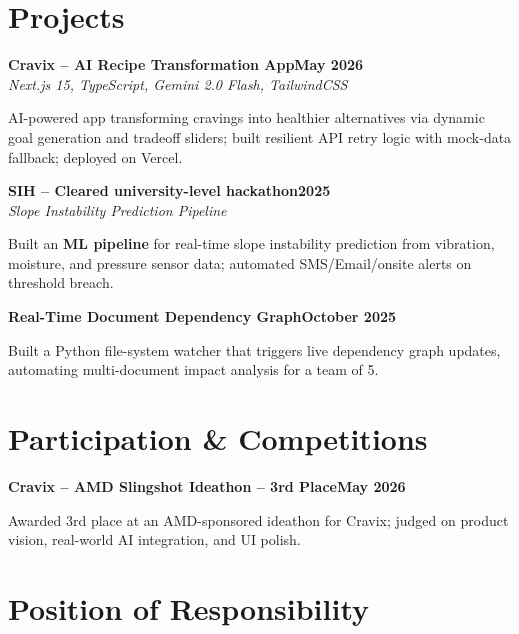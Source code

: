 \documentclass[letterpaper,10pt]{article}
\newcommand{\heading}[2]{
  \hspace{10pt}#1\hfill#2\\
}
\newcommand{\headingBf}[2]{
  \heading{\textbf{#1}}{\textbf{#2}}
}
\newcommand{\headingIt}[2]{
  \heading{\textit{#1}}{\textit{#2}}
}
\newenvironment{resume_list}{
  \vspace{-7pt}
  \begin{itemize}[itemsep=-2px, parsep=1pt, leftmargin=30pt]
}{
  \end{itemize}
}
\begin{document}
  \section{Projects}

  \headingBf{Cravix -- AI Recipe Transformation App}{May 2026}
  \headingIt{Next.js 15, TypeScript, Gemini 2.0 Flash, TailwindCSS}{}
  \begin{resume_list}
    \item AI-powered app transforming cravings into healthier alternatives via dynamic goal generation and tradeoff sliders; built resilient API retry logic with mock-data fallback; deployed on Vercel.
  \end{resume_list}

  \headingBf{SIH -- Cleared university-level hackathon}{2025}
  \headingIt{Slope Instability Prediction Pipeline}{}
  \begin{resume_list}
    \item Built an \textbf{ML pipeline} for real-time slope instability prediction from vibration, moisture, and pressure sensor data; automated SMS/Email/onsite alerts on threshold breach.
  \end{resume_list}

  \headingBf{Real-Time Document Dependency Graph}{October 2025}
  \begin{resume_list}
    \item Built a Python file-system watcher that triggers live dependency graph updates, automating multi-document impact analysis for a team of 5.
  \end{resume_list}


  \section{Participation \& Competitions}

  \headingBf{Cravix -- AMD Slingshot Ideathon -- 3rd Place}{May 2026}
  \begin{resume_list}
    \item Awarded 3rd place at an AMD-sponsored ideathon for Cravix; judged on product vision, real-world AI integration, and UI polish.
  \end{resume_list}


  \section{Position of Responsibility}
\end{document}
